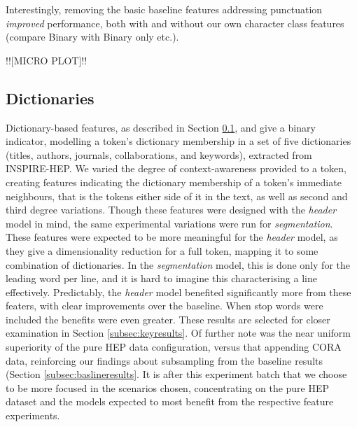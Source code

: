 Interestingly, removing the basic baseline features addressing punctuation \emph{improved} performance, both with and without our own character class features (compare Binary with Binary only etc.).

!![MICRO PLOT]!!

\subsection{Dictionaries}

Dictionary-based features, as described in Section \ref{}, and give a binary indicator, modelling a token's dictionary membership in a set of five dictionaries (titles, authors, journals, collaborations, and keywords), extracted from INSPIRE-HEP. We varied the degree of context-awareness provided to a token, creating features indicating the dictionary membership of a token's immediate neighbours, that is the tokens either side of it in the text, as well as second and third degree variations. Though these features were designed with the \emph{header} model in mind, the same experimental variations were run for \emph{segmentation}. These features were expected to be more meaningful for the \emph{header} model, as they give a dimensionality reduction for a full token, mapping it to some combination of dictionaries. In the \emph{segmentation} model, this is done only for the leading word per line, and it is hard to imagine this characterising a line effectively. Predictably, the \emph{header} model benefited significantly more from these featers, with clear improvements over the baseline. When stop words were included the benefits were even greater. These results are selected for closer examination in Section \ref{subsec:keyresults}. Of further note was the near uniform superiority of the pure HEP data configuration, versus that appending CORA data, reinforcing our findings about subsampling from the baseline results (Section \ref{subsec:baslineresults}. It is after this experiment batch that we choose to be more focused in the scenarios chosen, concentrating on the pure HEP dataset and the models expected to most benefit from the respective feature experiments.

